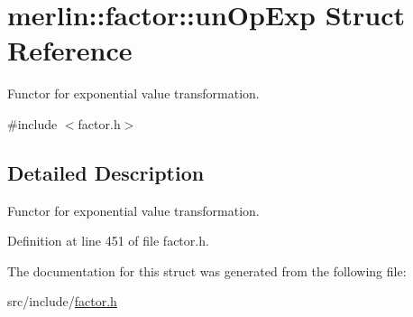 \hypertarget{structmerlin_1_1factor_1_1unOpExp}{}\section{merlin\+:\+:factor\+:\+:un\+Op\+Exp Struct Reference}
\label{structmerlin_1_1factor_1_1unOpExp}


Functor for exponential value transformation.  




{\ttfamily \#include $<$factor.\+h$>$}



\subsection{Detailed Description}
Functor for exponential value transformation. 

Definition at line 451 of file factor.\+h.



The documentation for this struct was generated from the following file\+:\begin{DoxyCompactItemize}
\item 
src/include/\hyperlink{factor_8h}{factor.\+h}\end{DoxyCompactItemize}

